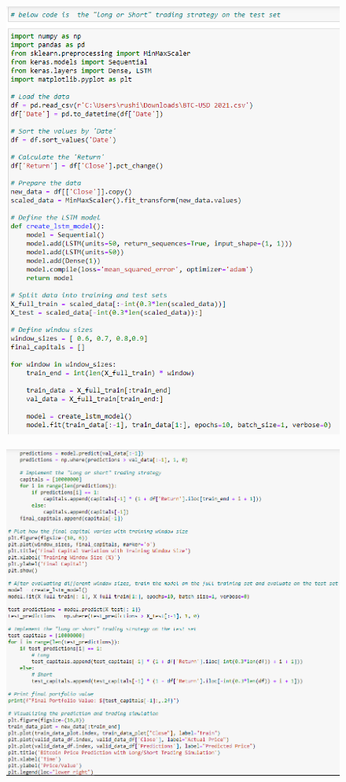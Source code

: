 \begin{figure}[H]
\centering
\includegraphics[scale=0.65]{fig28.jpg}
\end{figure}

\begin{figure}[H]
\centering
\includegraphics[scale=0.65]{fig29.jpg}
\end{figure}

